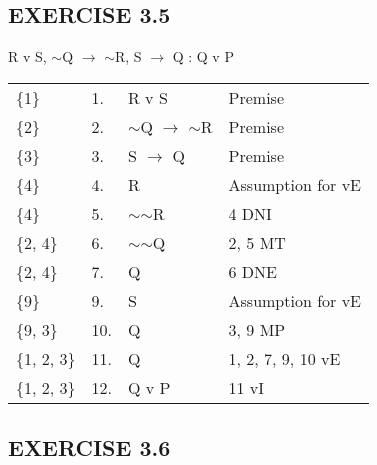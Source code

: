 \documentclass[a4paper,12pt]{article}
\newcommand{\ra}{$\rightarrow$ }
\newcommand{\s}{$\sim$}
\begin{document}
\begin{enumerate}[label=\arabic*,leftmargin=*]
\begin{enumerate}[label=\arabic*.]
            \end{enumerate}
    \end{enumerate}

    \subsection*{EXERCISE 3.5}

    \begin{enumerate}[label=\arabic*,leftmargin=*]

        \begin{minipage}{\textwidth}
        \item R v S, \s Q \ra \s R, S \ra Q : Q v P
            \nopagebreak
            \vspace{1em}\\
            \begin{tabular}{l l l l}
                \{1\} & 1. & R v S & Premise\\
                \{2\} & 2. & \s Q \ra \s R & Premise\\
                \{3\} & 3. & S \ra Q & Premise\\
                \{4\} & 4. & R & Assumption for vE\\
                \{4\} & 5. & \s \s R & 4 DNI\\
                \{2, 4\} & 6. & \s \s Q & 2, 5 MT\\
                \{2, 4\} & 7. & Q & 6 DNE\\
                \{9\} & 9. & S & Assumption for vE\\
                \{9, 3\} & 10. & Q & 3, 9 MP\\
                \{1, 2, 3\} & 11. & Q & 1, 2, 7, 9, 10 vE\\
                \{1, 2, 3\} & 12. & Q v P & 11 vI\\
            \end{tabular}
        \end{minipage}

    \end{enumerate}

    \subsection*{EXERCISE 3.6}
\end{document}

